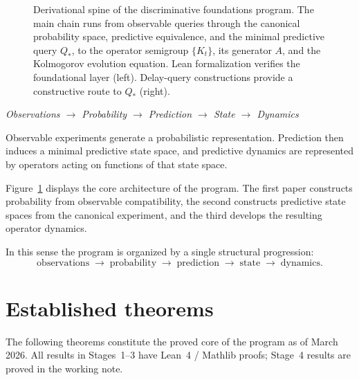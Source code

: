 \documentclass[11pt]{article}
\begin{document}
\begin{figure}[H]
{
}%

\caption{Derivational spine of the discriminative foundations program.
The main chain runs from observable queries through the canonical
probability space, predictive equivalence, and the minimal predictive
query $Q_*$, to the operator semigroup $\{K_t\}$, its generator $A$,
and the Kolmogorov evolution equation.
Lean formalization verifies the foundational layer (left).
Delay-query constructions provide a constructive route to $Q_*$ (right).}
\label{fig:observable-dynamics-program}

\end{figure}

\begin{center}
\textit{Observations $\rightarrow$ Probability $\rightarrow$ Prediction $\rightarrow$ State $\rightarrow$ Dynamics}
\end{center}

Observable experiments generate a probabilistic representation.
Prediction then induces a minimal predictive state space, and
predictive dynamics are represented by operators acting on functions
of that state space.

Figure~\ref{fig:observable-dynamics-program} displays the core architecture of the
program.  The first paper constructs probability from observable
compatibility, the second constructs predictive state spaces from the
canonical experiment, and the third develops the resulting operator
dynamics.

In this sense the program is organized by a single structural
progression:
\[
\text{observations}
\;\longrightarrow\;
\text{probability}
\;\longrightarrow\;
\text{prediction}
\;\longrightarrow\;
\text{state}
\;\longrightarrow\;
\text{dynamics}.
\]


\section{Established theorems}

The following theorems constitute the proved core of the program as of
March 2026.  All results in Stages~1--3 have Lean~4 / Mathlib proofs;
Stage~4 results are proved in the working note.
\end{document}
